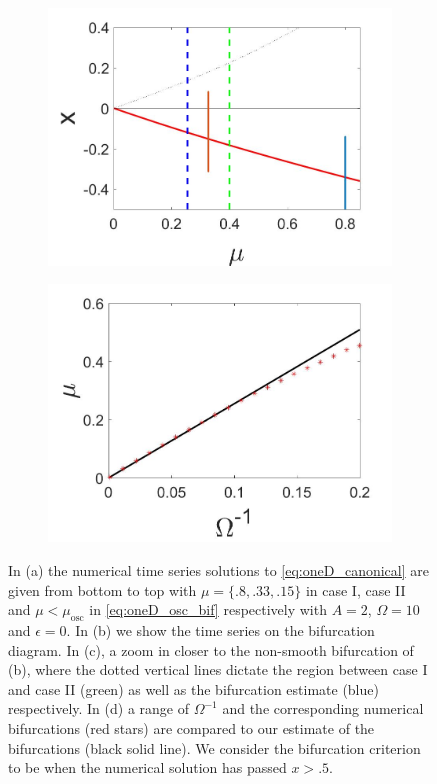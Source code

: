 \begin{figure}[H]
\begin{subfigure}{.5\textwidth}
 \includegraphics[width=\linewidth]{oneD/osc_bif_diagram_zoom.jpg}
 \caption{}
\end{subfigure}%
\begin{subfigure}{.5\textwidth}
\centering
\includegraphics[width=\linewidth]{oneD/osc_Omegacomp.jpg}
\caption{}
\label{fig:oneD_osc_comp}
\end{subfigure}
\caption{In (a) the numerical time series solutions to \eqref{eq:oneD_canonical} are given from bottom to top with $\mu=\{.8,.33,.15\}$ in case I, case II and $\mu<\mu_{\text{osc}}$ in \eqref{eq:oneD_osc_bif} respectively with $A=2$, $\Omega=10$ and $\epsilon=0$. In (b) we show the time series on the bifurcation diagram. In (c), a zoom in closer to the non-smooth bifurcation of (b), where the dotted vertical lines dictate the region between case I and case II (green) as well as the bifurcation estimate (blue) respectively. In (d) a range of $\Omega^{-1}$ and the corresponding numerical bifurcations (red stars) are compared to our estimate of the bifurcations (black solid line). We consider the bifurcation criterion to be when the numerical solution has passed $x>.5$.}
\label{fig:oneD_osc_numerics}
\end{figure}

